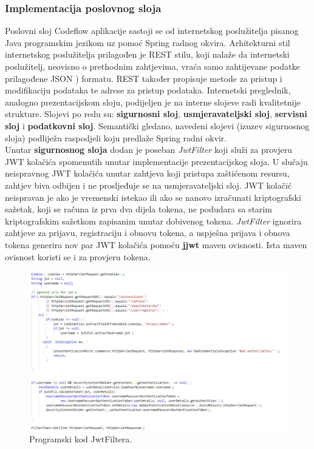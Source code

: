 \documentclass[times, utf8, zavrsni]{fer}
\begin{document}
	 		\subsubsection{Implementacija poslovnog sloja}
	 		Poslovni sloj Codeflow aplikacije sastoji se od internetskog poslužitelja pisanog Java programskim jezikom uz pomoć Spring radnog okvira. Arhitekturni stil internetskog poslužitelja prilagođen je REST  stilu, koji nalaže da internetski poslužitelj, neovisno o prethodnim zahtjevima, vraća samo zahtijevane podatke prilagođene JSON ) formatu. REST također propisuje metode za pristup i modifikaciju podataka te adrese za pristup podataka. Internetski preglednik, analogno prezentacijskom sloju, podijeljen je na interne slojeve radi kvalitetnije strukture. Slojevi po redu su: \textbf{sigurnosni sloj}, \textbf{usmjeravateljski sloj}, \textbf{servisni sloj} i \textbf{podatkovni sloj}. Semantički gledano, navedeni slojevi (izuzev sigurnosnog sloja) podliježu raspodjeli koju predlaže Spring radni okvir.\\
	 		Unutar \textbf{sigurnosnog sloja} dodan je poseban \textit{JwtFilter} koji služi za provjeru JWT kolačića spomenutih unutar implementacije prezentacijskog sloja. U slučaju neispravnog JWT kolačića unutar zahtjeva koji pristupa zaštićenom resursu, zahtjev biva odbijen i ne prosljeđuje se na usmjeravateljski sloj. JWT kolačić neispravan je ako je vremenski istekao ili ako se nanovo izračunati kriptografski sažetak, koji se računa  iz prva dva dijela tokena, ne podudara sa starim kriptografskim sažetkom zapisanim unutar dobivenog tokena. \textit{JwtFilter} ignorira zahtjeve za prijavu, registraciju i obnovu tokena, a uspješna prijava i obnova tokena generira nov par JWT kolačića pomoću \textbf{jjwt} maven ovisnosti. Ista maven ovisnost koristi se i za provjeru tokena.
	 		\begin{figure}[H]
	 			\centering
	 			\includegraphics[width=\linewidth]{pictures/prikazi/JwtFilter.png}
	 			\caption{Programski kod JwtFiltera.}
	 			\label{fig:jwtfilter}
	 		\end{figure}
 		
\end{document}
